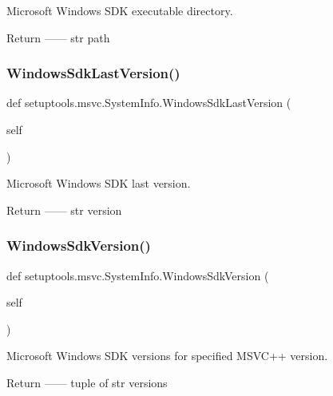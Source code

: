 \begin{DoxyVerb}Microsoft Windows SDK executable directory.

Return
------
str
    path
\end{DoxyVerb}
 \mbox{\label{classsetuptools_1_1msvc_1_1SystemInfo_a379cb993ab7a7634c5806a4646a3cb15}} 
\subsubsection{\texorpdfstring{Windows\+Sdk\+Last\+Version()}{WindowsSdkLastVersion()}}
{\footnotesize\ttfamily def setuptools.\+msvc.\+System\+Info.\+Windows\+Sdk\+Last\+Version (\begin{DoxyParamCaption}\item[{}]{self }\end{DoxyParamCaption})}

\begin{DoxyVerb}Microsoft Windows SDK last version.

Return
------
str
    version
\end{DoxyVerb}
 \mbox{\label{classsetuptools_1_1msvc_1_1SystemInfo_ae7566034b3ec2e80c3bf9d6d9289dc1b}} 
\subsubsection{\texorpdfstring{Windows\+Sdk\+Version()}{WindowsSdkVersion()}}
{\footnotesize\ttfamily def setuptools.\+msvc.\+System\+Info.\+Windows\+Sdk\+Version (\begin{DoxyParamCaption}\item[{}]{self }\end{DoxyParamCaption})}

\begin{DoxyVerb}Microsoft Windows SDK versions for specified MSVC++ version.

Return
------
tuple of str
    versions
\end{DoxyVerb}
 

